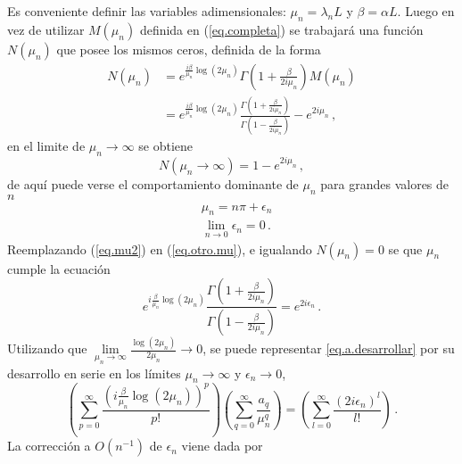 Es conveniente definir las variables adimensionales: $\mu _n = \lambda _nL $ y $\beta = \alpha L$. Luego en vez de utilizar $M (\mu _n)$ definida en (\ref{eq.completa}) se trabajará una función $N (\mu _n)$ que posee los mismos ceros, definida de la forma
\begin{align}
\nonumber
N (\mu _n) &=
e ^{\frac{i \beta }{\mu _n} \log(2 \mu _n) }
\Gamma \left( 1 + \frac{ \beta}{2 i \mu _n} \right)
M (\mu _n) \\ 
&=  
e ^{\frac{i \beta }{\mu _n} \log(2 \mu _n) }
\frac{\Gamma \left(1 + \frac{ \beta}{2 i \mu _n} \right)}
	{\Gamma \left(1 - \frac{ \beta}{2 i \mu _n} \right)}
- e ^{2 i \mu _n}
\, ,
\label{eq.otro.mu}
\end{align}
en el limite de $\mu _n \rightarrow \infty$ se obtiene
\begin{equation}
    N(\mu _n  \rightarrow \infty) = 
	1 - e ^{2 i \mu _n}
		\, ,
\end{equation}
de aquí puede verse el comportamiento dominante  de $\mu _n$ para grandes valores de $n$
\begin{equation}
\begin{aligned}
    &\mu _n = n \pi + \epsilon _n \\[5pt]
	&\lim \limits _{n \rightarrow{0}} \epsilon _n  = 0
		\, .
\end{aligned}
\label{eq.mu2}
\end{equation}
Reemplazando (\ref{eq.mu2}) en (\ref{eq.otro.mu}), e igualando $N (\mu _n) = 0$ se que $\mu _n$ cumple la ecuación
\begin{equation}
	e ^{ i \frac{\beta}{ \mu _n} \log (2 \mu _n)}     
    \frac{\Gamma(1 + \frac{ \beta}{2  i \mu _n} ) }
    {\Gamma(1 -  \frac{ \beta}{2  i \mu _n} )} =    
    e ^{2 i \epsilon _n }
    	\, .
\label{eq.a.desarrollar}
\end{equation}
Utilizando que  $ \lim \limits_{\mu _n \rightarrow \infty} \frac{\log (2 \mu _n)}{2 \mu _n } \rightarrow 0$, se puede representar \ref{eq.a.desarrollar} por su desarrollo en serie en los límites $ \mu _n \rightarrow \infty $ y $\epsilon _n \rightarrow 0$,
\begin{equation}
    \left(
    \sum _{p = 0} ^{\infty} \frac{ \left( i \frac{\beta}{ \mu _n } \log(2 \mu _n ) \right) ^p }{p!}
    \right)
    \left(
	\sum _{q = 0} ^{\infty} \frac{a _q}{\mu _n ^q}
	\right)
    =
    \left(
    \sum _{l = 0} ^{\infty} \frac{( 2 i \epsilon _n)^l}{l !}
    \right)
    	\, .
\end{equation}
La corrección a $O ( n ^{-1}) $ de $\epsilon _n$ viene dada por

